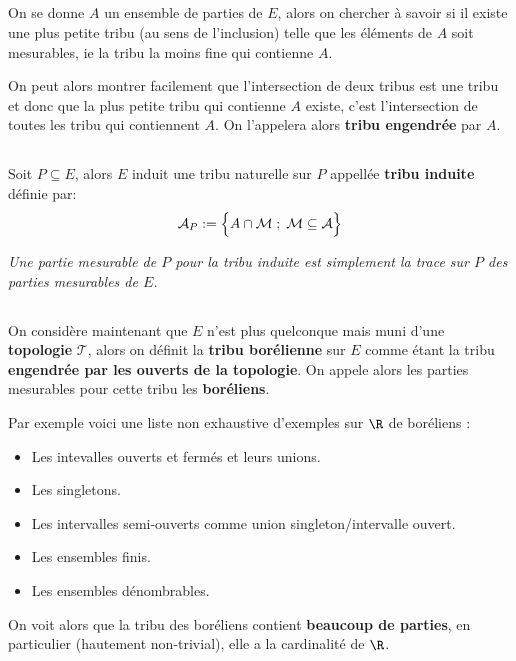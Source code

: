 \subsection*{}
On se donne \(A\) un ensemble de parties de \(E\), alors on chercher à savoir si il existe une plus petite tribu (au sens de l'inclusion) telle que les éléments de \(A\) soit mesurables, ie la tribu la moins fine qui contienne \(A\).\<

On peut alors montrer facilement que l'intersection de deux tribus est une tribu et donc que la plus petite tribu qui contienne \(A\) existe, c'est l'intersection de toutes les tribu qui contiennent \(A\). On l'appelera alors \textbf{tribu engendrée} par \(A\).

\subsection*{}
Soit \(P \subseteq E\), alors \(E\) induit une tribu naturelle sur \(P\) appellée \textbf{tribu induite} définie par:
\[
   \mathcal{A}_P := \Bigl\{ A \cap \mathcal{M} \; ; \; \mathcal{M} \subseteq \mathcal{A} \Bigl\}  
\]
\begin{center}
   \textit{Une partie mesurable de \(P\) pour la tribu induite est simplement la trace sur \(P\) des parties mesurables de \(E\).}
\end{center}
\pagebreak

\subsection*{}
On considère maintenant que \(E\) n'est plus quelconque mais muni d'une \textbf{topologie} \(\mathcal{T}\), alors on définit la \textbf{tribu borélienne} sur \(E\) comme étant la tribu \textbf{engendrée par les ouverts de la topologie}. On appele alors les parties mesurables pour cette tribu les \textbf{boréliens}.\<

Par exemple voici une liste non exhaustive d'exemples sur \(\R\) de boréliens :
\begin{itemize}
   \item Les intevalles ouverts et fermés et leurs unions.
   \item Les singletons.
   \item Les intervalles semi-ouverts comme union singleton/intervalle ouvert.
   \item Les ensembles finis.
   \item Les ensembles dénombrables.
\end{itemize}
On voit alors que la tribu des boréliens contient \textbf{beaucoup de parties}, en particulier (hautement non-trivial), elle a la cardinalité de \(\R\).

